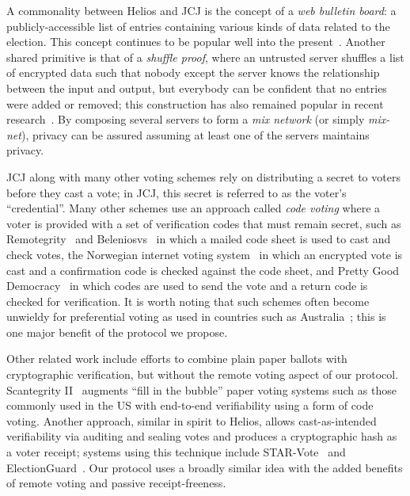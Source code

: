 \documentclass[12pt,a4paper]{article}
\theoremstyle{definition}
\begin{document}
A commonality between Helios and JCJ is the concept of a \textit{web bulletin board}: a publicly-accessible list of entries containing various kinds of data related to the election. This concept continues to be popular well into the present~\cite{kiayias2018security}. Another shared primitive is that of a \textit{shuffle proof}, where an untrusted server shuffles a list of encrypted data such that nobody except the server knows the relationship between the input and output, but everybody can be confident that no entries were added or removed; this construction has also remained popular in recent research~\cite{cortier2017machine}. By composing several servers to form a \textit{mix network} (or simply \textit{mix-net}), privacy can be assured assuming at least one of the servers maintains privacy.

JCJ along with many other voting schemes rely on distributing a secret to voters before they cast a vote; in JCJ, this secret is referred to as the voter's ``credential''. Many other schemes use an approach called \textit{code voting} where a voter is provided with a set of verification codes that must remain secret, such as Remotegrity~\cite{zagorski2013remotegrity} and Beleniosvs~\cite{cortier2019beleniosvs} in which a mailed code sheet is used to cast and check votes, the Norwegian internet voting system~\cite{gjosteen2011norwegian} in which an encrypted vote is cast and a confirmation code is checked against the code sheet, and Pretty Good Democracy~\cite{ryan2009pretty} in which codes are used to send the vote and a return code is checked for verification. It is worth noting that such schemes often become unwieldy for preferential voting as used in countries such as Australia~\cite{aditya2003secure}; this is one major benefit of the protocol we propose.

Other related work include efforts to combine plain paper ballots with cryptographic verification, but without the remote voting aspect of our protocol. Scantegrity II~\cite{chaum2008scantegrity} augments ``fill in the bubble'' paper voting systems such as those commonly used in the US with end-to-end verifiability using a form of code voting. Another approach, similar in spirit to Helios, allows cast-as-intended verifiability via auditing and sealing votes and produces a cryptographic hash as a voter receipt; systems using this technique include STAR-Vote~\cite{bell2013star} and ElectionGuard~\cite{electionguard}. Our protocol uses a broadly similar idea with the added benefits of remote voting and passive receipt-freeness.
\end{document}
